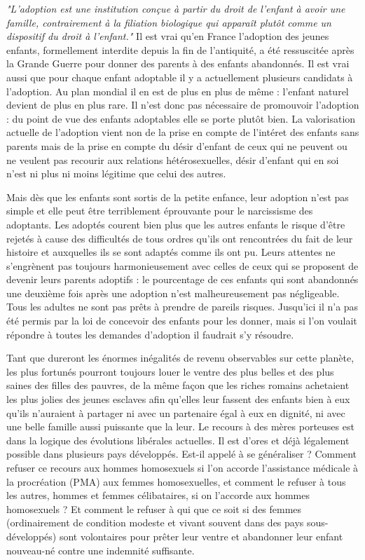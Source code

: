 \emph{"L'adoption est une institution conçue à partir du droit de l'enfant à avoir une famille, contrairement à la filiation biologique qui apparaît plutôt comme un dispositif du droit à l'enfant."} Il est vrai qu'en France l'adoption des jeunes enfants, formellement interdite depuis la fin de l'antiquité, a été ressuscitée après la Grande Guerre pour donner des parents à des enfants abandonnés. Il est vrai aussi que pour chaque enfant adoptable il y a actuellement plusieurs candidats à l'adoption. Au plan mondial il en est de plus en plus de même : l'enfant naturel devient de plus en plus rare. Il n’est donc pas nécessaire de promouvoir l’adoption : du point de vue des enfants adoptables elle se porte plutôt bien. La valorisation actuelle de l'adoption vient non de la prise en compte de l'intéret des enfants sans parents mais de la prise en compte du désir d'enfant de ceux qui ne peuvent ou ne veulent pas recourir aux relations hétérosexuelles, désir d'enfant qui en soi n'est ni plus ni moins légitime que celui des autres.  
 
 Mais dès que les enfants sont sortis de la petite enfance, leur adoption n'est pas simple et elle peut être terriblement éprouvante pour le narcissisme des adoptants. Les adoptés courent bien plus que les autres enfants le risque d'être rejetés à cause des difficultés de tous ordres qu'ils ont rencontrées du fait de leur histoire et auxquelles ils se sont adaptés comme ils ont pu. Leurs attentes ne s'engrènent pas toujours harmonieusement avec celles de ceux qui se proposent de devenir leurs parents adoptifs : le pourcentage de ces enfants qui sont abandonnés une deuxième fois après une adoption n'est malheureusement pas négligeable. Tous les adultes ne sont pas prêts à prendre de pareils risques. 
Jusqu'ici il n'a pas été permis par la loi de concevoir des enfants pour les donner, mais si l'on voulait répondre à toutes les demandes d'adoption il faudrait s'y résoudre. 

Tant que dureront les énormes inégalités de revenu observables sur cette planète, les plus fortunés pourront toujours louer le ventre des plus belles et des plus saines des filles des pauvres, de la même façon que les riches romains achetaient les plus jolies des jeunes esclaves afin qu'elles leur fassent des enfants bien à eux qu'ils n'auraient à partager ni avec un partenaire égal à eux en dignité, ni avec une belle famille aussi puissante que la leur. Le recours à des mères porteuses est dans la logique des évolutions libérales actuelles. Il est d'ores et déjà légalement possible dans plusieurs pays développés. Est-il appelé à se généraliser ? Comment refuser ce recours aux hommes homosexuels si l'on accorde l'assistance médicale à la procréation (PMA) aux femmes homosexuelles, et comment le refuser à tous les autres, hommes et femmes célibataires, si on l'accorde aux hommes homosexuels ? Et comment le refuser à qui que ce soit si des femmes (ordinairement de condition modeste et vivant souvent dans des pays sous-développés) sont volontaires pour prêter leur ventre et abandonner leur enfant nouveau-né contre une indemnité suffisante. 

